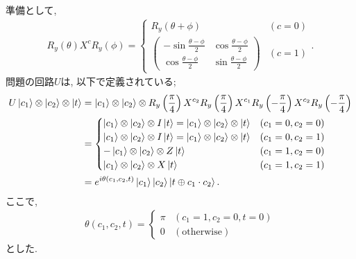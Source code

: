 \begin{ex}
    \label{ex4.26}
    準備として,
    \begin{align*}
        R_y(\theta) X^c R_y(\phi) =
        \begin{cases}
            R_y(\theta + \phi)         & (c=0) \\
            \begin{pmatrix}
                - \sin \frac{\theta - \phi}{2} & \cos\frac{\theta - \phi}{2} \\
                \cos \frac{\theta - \phi}{2}   & \sin\frac{\theta - \phi}{2}
            \end{pmatrix} & (c=1)
        \end{cases}.
    \end{align*}
    問題の回路$U$は, 以下で定義されている;
    \begin{align*}
        U \ket{c_1} \otimes \ket{c_2}\otimes\ket{t}
         & = \ket{c_1} \otimes\ket{c_2}\otimes
        R_y \left(\frac{\pi}{4}\right)
        X^{c_2}
        R_y \left(\frac{\pi}{4}\right)
        X^{c_1}
        R_y \left(-\frac{\pi}{4}\right)
        X^{c_2}
        R_y \left(-\frac{\pi}{4}\right)
        \\
         & =
        \begin{cases}
            \ket{c_1}\otimes \ket{c_2}\otimes I \ket{t}
            =
            \ket{c_1}\otimes \ket{c_2}\otimes \ket{t}    & (c_1 = 0, c_2 = 0) \\
            \ket{c_1}\otimes \ket{c_2}\otimes I \ket{t}
            =
            \ket{c_1}\otimes \ket{c_2}\otimes  \ket{t}   & (c_1 = 0, c_2 = 1) \\
            -\ket{c_1}\otimes \ket{c_2}\otimes Z \ket{t} & (c_1 = 1, c_2 = 0) \\
            \ket{c_1}\otimes \ket{c_2}\otimes X \ket{t}  & (c_1 = 1, c_2 = 1) \\
        \end{cases}
        \\
         & =
        e^{i \theta(c_1 ,c_2, t)} \ket{c_1} \ket{c_2} \ket{t \oplus c_1 \cdot c_2} .
    \end{align*}
    ここで,
    \begin{align*}
        \theta(c_1, c_2, t) =
        \begin{cases}
            \pi & ( c_1 = 1, c_2 = 0, t = 0) \\
            0   & (\mathrm{otherwise})
        \end{cases}
    \end{align*}
    とした.
\end{ex}

